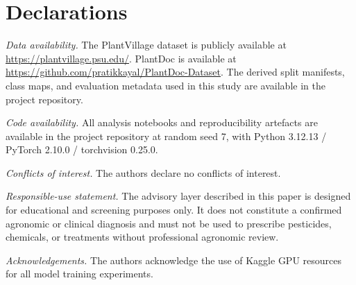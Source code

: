 \documentclass[conference]{IEEEtran}
\begin{document}
\section*{Declarations}

\textit{Data availability.} The PlantVillage dataset is publicly available
at \url{https://plantvillage.psu.edu/}. PlantDoc is available at
\url{https://github.com/pratikkayal/PlantDoc-Dataset}. The derived split
manifests, class maps, and evaluation metadata used in this study are
available in the project repository.

\textit{Code availability.} All analysis notebooks and reproducibility
artefacts are available in the project repository at random seed 7,
with Python 3.12.13 / PyTorch 2.10.0 / torchvision 0.25.0.

\textit{Conflicts of interest.} The authors declare no conflicts of interest.

\textit{Responsible-use statement.} The advisory layer described in this paper
is designed for educational and screening purposes only. It does not constitute
a confirmed agronomic or clinical diagnosis and must not be used to prescribe
pesticides, chemicals, or treatments without professional agronomic review.

\textit{Acknowledgements.} The authors acknowledge the use of Kaggle GPU
resources for all model training experiments.

\balance



\end{document}
